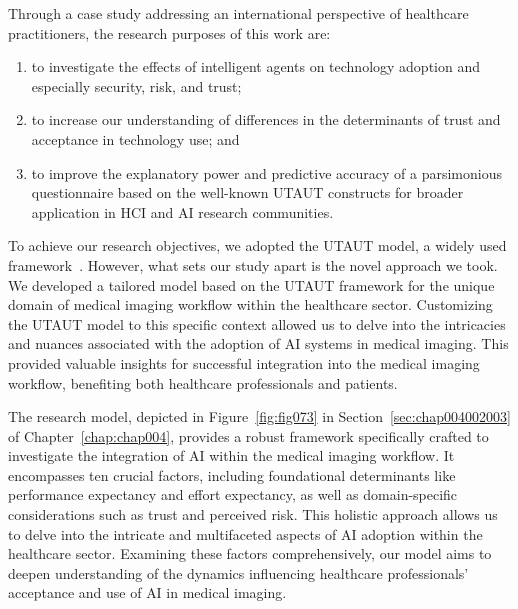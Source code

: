 \vspace{2.00mm}

\noindent
Through a case study addressing an international perspective of healthcare practitioners, the research purposes of this work are:

\vspace{0.05mm}

\begin{enumerate}
\item to investigate the effects of intelligent agents on technology adoption and especially security, risk, and trust;
\item to increase our understanding of differences in the determinants of trust and acceptance in technology use; and
\item to improve the explanatory power and predictive accuracy of a parsimonious questionnaire based on the well-known \ac{UTAUT} constructs for broader application in \ac{HCI} and \ac{AI} research communities.
\end{enumerate}

\vspace{0.05mm}

\textcolor{revised}{To achieve our research objectives, we adopted the \ac{UTAUT} model, a widely used framework~\cite{BOOTSMAN201999}.
However, what sets our study apart is the novel approach we took.
We developed a tailored model based on the \ac{UTAUT} framework for the unique domain of medical imaging workflow within the healthcare sector. Customizing the \ac{UTAUT} model to this specific context allowed us to delve into the intricacies and nuances associated with the adoption of \ac{AI} systems in medical imaging.
This provided valuable insights for successful integration into the medical imaging workflow, benefiting both healthcare professionals and patients.}

\textcolor{revised}{The research model, depicted in Figure~\ref{fig:fig073} in Section~\ref{sec:chap004002003} of Chapter~\ref{chap:chap004}, provides a robust framework specifically crafted to investigate the integration of \ac{AI} within the medical imaging workflow.
It encompasses ten crucial factors, including foundational determinants like performance expectancy and effort expectancy, as well as domain-specific considerations such as trust and perceived risk.
This holistic approach allows us to delve into the intricate and multifaceted aspects of \ac{AI} adoption within the healthcare sector.
Examining these factors comprehensively, our model aims to deepen understanding of the dynamics influencing healthcare professionals' acceptance and use of \ac{AI} in medical imaging.}

